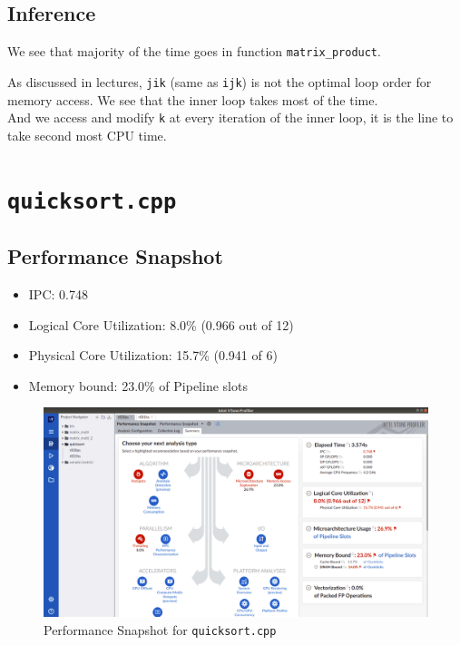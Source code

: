 \documentclass[11pt, swedish, openany]{book}
\begin{document}
\subsection*{Inference}
We see that majority of the time goes in function \texttt{matrix\_product}.

As discussed in lectures, \texttt{jik} (same as \texttt{ijk}) is not the optimal loop order for memory access. We see that the inner loop takes most of the time. \\
And we access and modify \texttt{k} at every iteration of the inner loop, it is the line to take second most CPU time.


\newpage
\section{\texttt{quicksort.cpp}}

\subsection*{Performance Snapshot}
\begin{itemize}
    \item IPC: 0.748
    \item Logical Core Utilization: 8.0\% (0.966 out of 12)
    \item Physical Core Utilization: 15.7\% (0.941 of 6)
    \item Memory bound: 23.0\% of Pipeline slots
\end{itemize}

\begin{figure}[H]
    \centering
    \includegraphics[scale=0.25]{vtune/quicksort/ps.png}
    \caption{Performance Snapshot for \texttt{quicksort.cpp}}
\end{figure}

\newpage
\end{document}
